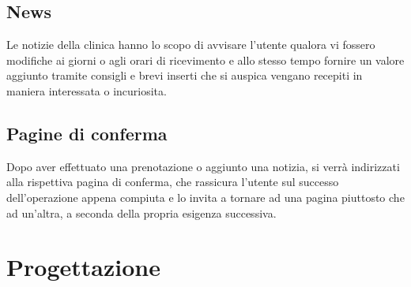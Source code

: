 \documentclass{article}
\begin{document}
\subsection{News}
Le notizie della clinica hanno lo scopo di avvisare l'utente qualora vi fossero modifiche ai giorni o agli orari di ricevimento e allo stesso tempo fornire un valore aggiunto tramite consigli e brevi inserti che si auspica vengano recepiti in maniera interessata o incuriosita.
\subsection{Pagine di conferma}
Dopo aver effettuato una prenotazione o aggiunto una notizia, si verrà indirizzati alla rispettiva pagina di conferma, che rassicura l'utente sul successo dell'operazione appena compiuta e lo invita a tornare ad una pagina piuttosto che ad un'altra, a seconda della propria esigenza successiva.
\newpage
\section{Progettazione}
\end{document}
